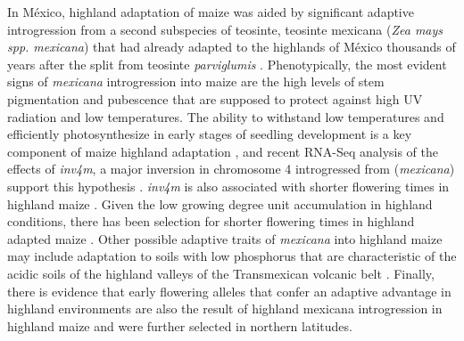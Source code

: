\documentclass[9pt,twocolumn,twoside,lineno]{BioRxiv}
\begin{document}
In México, highland adaptation of maize was aided by significant adaptive introgression from a second subspecies of teosinte, teosinte mexicana (\textit{Zea mays spp. mexicana}) that had already adapted to the highlands of México thousands of years after the split from teosinte \textit{parviglumis} \cite{Hufford2013-gs, Gonzalez-Segovia2019-jy}. 
Phenotypically, the most evident signs of \textit{mexicana} introgression into maize are the high levels of stem pigmentation and pubescence \cite{Lauter2004-eq} that are supposed to protect against high UV radiation and low temperatures. 
The ability to withstand low temperatures and efficiently photosynthesize in early stages of seedling development is a key component of maize highland adaptation \cite{Hardacre1980-tq}, and recent RNA-Seq analysis of the effects of \textit{inv4m}, a major inversion in chromosome 4 introgressed from (\textit{mexicana}) support this hypothesis \cite{Crow2020-gene}.
\textit{inv4m} is also associated with shorter flowering times in highland maize \cite{Romero_Navarro2017-cn, Gates2019-xu}. 
Given the low growing degree unit accumulation in highland conditions, there has been selection for shorter flowering times in highland adapted maize \cite{Gates2019-xu}. 
Other possible adaptive traits of \textit{mexicana} into highland maize may include adaptation to soils with low phosphorus \cite{AguirreLiguori2019-fl, Fustier2017-sl} that are characteristic of the acidic soils of the highland valleys of the Transmexican volcanic belt \cite{Krasilnikov2013-sm}.
Finally, there is evidence that early flowering alleles that confer an adaptive advantage in highland environments are also the result of highland mexicana introgression in highland maize \cite{Guo2018-on} and were further selected in northern latitudes.
\end{document}
